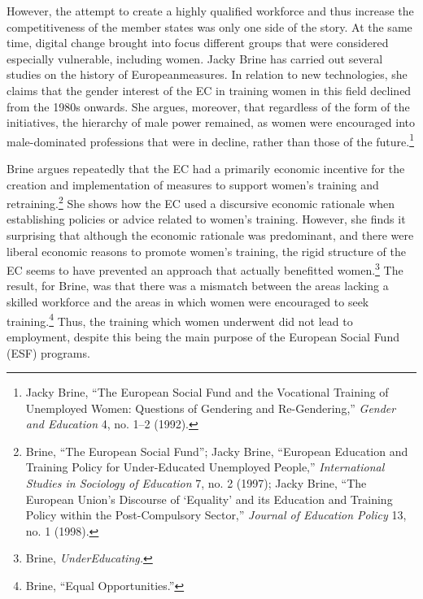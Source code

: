 \documentclass{tufte-handout}
\begin{document}
However, the attempt to create a highly qualified workforce and thus
increase the competitiveness of the member states was only one side of
the story. At the same time, digital change brought into focus different
groups that were considered especially vulnerable, including women.
Jacky Brine has carried out several studies on the history of Europeanmeasures. In relation to new technologies, she claims that the
gender 
interest of the EC in training women in this field declined from the
1980s onwards. She argues, moreover, that regardless of the form of the
initiatives, the hierarchy of male power remained, as women were
encouraged into male-dominated professions that were in decline, rather
than those of the future.\footnote{Jacky Brine, ``The European Social
  Fund and the Vocational Training of Unemployed Women: Questions of
  Gendering and Re-Gendering,'' \emph{Gender and Education} 4, no. 1--2
  (1992).}

Brine argues repeatedly that the EC had a primarily economic incentive
for the creation and implementation of measures to support women's
training and retraining.\footnote{Brine, ``The European Social Fund'';
  Jacky Brine, ``European Education and Training Policy for
  Under-Educated Unemployed People,'' \emph{International Studies in
  Sociology of Education} 7, no. 2 (1997); Jacky Brine, ``The European
  Union's Discourse of `Equality' and its Education and Training Policy
  within the Post-Compulsory Sector,'' \emph{Journal of Education
  Policy} 13, no. 1 (1998).} She shows how the EC used a discursive
economic rationale when establishing policies or advice related to
women's training. However, she finds it surprising that although the
economic rationale was predominant, and there were liberal economic
reasons to promote women's training, the rigid structure of the EC seems
to have prevented an approach that actually benefitted women.\footnote{Brine,
  \emph{UnderEducating.}} The result, for Brine, was that there was a
mismatch between the areas lacking a skilled workforce and the areas in
which women were encouraged to seek training.\footnote{Brine, ``Equal
  Opportunities.''} Thus, the training which women underwent did not
lead to employment, despite this being the main purpose of the European
Social Fund (ESF) programs.
\end{document}
